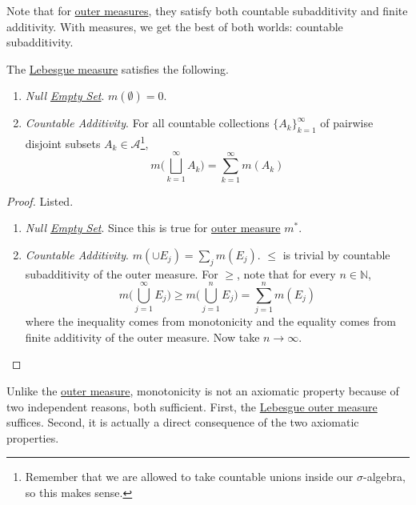  Note that for \hyperref[def:outer-measure]{outer measures}, they satisfy both countable subadditivity and finite additivity. With measures, we get the best of both worlds: countable subadditivity. 

  \begin{lemma}
    \label{thm:axiomatic-properties-of-lebesgue-measure}
    The \hyperref[def:lebesgue-measure]{Lebesgue measure} satisfies the following. 
    \begin{enumerate}
      \item \textit{Null \hyperref[st-def:empty-set]{Empty Set}}. $m(\emptyset) = 0$. 
      \item \textit{Countable Additivity}. For all countable collections $\{A_k\}_{k=1}^\infty$ of pairwise disjoint subsets $A_k \in \mathcal{A}$\footnote{Remember that we are allowed to take countable unions inside our $\sigma$-algebra, so this makes sense.}, 
      \begin{equation}
        m \bigg( \bigsqcup_{k=1}^\infty A_k \bigg) = \sum_{k=1}^\infty m(A_k)
      \end{equation}
    \end{enumerate}
  \end{lemma}
  \begin{proof}
    Listed. 
    \begin{enumerate}
      \item \textit{Null \hyperref[st-def:empty-set]{Empty Set}}. Since this is true for \hyperref[def:outer-measure]{outer measure} $m^\ast$. 
      \item \textit{Countable Additivity}. $m( \cup E_j) = \sum_j m(E_j)$. $\leq$ is trivial by countable subadditivity of the outer measure. For $\geq$, note that for every $n \in \mathbb{N}$, 
      \begin{equation}
        m \bigg( \bigcup_{j=1}^\infty E_j \bigg) \geq m \bigg( \bigcup_{j=1}^n E_j \bigg) = \sum_{j=1}^n m(E_j) 
      \end{equation}
      where the inequality comes from monotonicity and the equality comes from finite additivity of the outer measure. Now take $n \to \infty$. 
    \end{enumerate}
  \end{proof}

  Unlike the \hyperref[def:outer-measure]{outer measure}, monotonicity is not an axiomatic property because of two independent reasons, both sufficient. First, the \hyperref[def:lebesgue-outer-measure]{Lebesgue outer measure} suffices. Second, it is actually a direct consequence of the two axiomatic properties.  

